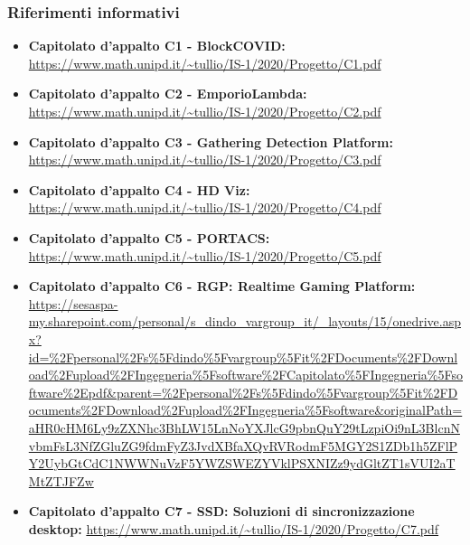 \subsubsection{Riferimenti informativi}
\begin{itemize}
\item \textbf{Capitolato d'appalto C1 - BlockCOVID:}\newline
\url{https://www.math.unipd.it/~tullio/IS-1/2020/Progetto/C1.pdf}
\item \textbf{Capitolato d'appalto C2 - EmporioLambda:}\newline
\url{https://www.math.unipd.it/~tullio/IS-1/2020/Progetto/C2.pdf}
\item \textbf{Capitolato d'appalto C3 - Gathering Detection Platform:}\newline
\url{https://www.math.unipd.it/~tullio/IS-1/2020/Progetto/C3.pdf}
\item \textbf{Capitolato d'appalto C4 - HD Viz:}\newline
\url{https://www.math.unipd.it/~tullio/IS-1/2020/Progetto/C4.pdf}
\item \textbf{Capitolato d'appalto C5 - PORTACS:}\newline
\url{https://www.math.unipd.it/~tullio/IS-1/2020/Progetto/C5.pdf}
\item \textbf{Capitolato d'appalto C6 - RGP: Realtime Gaming Platform:}\newline
\url{https://sesaspa-my.sharepoint.com/personal/s_dindo_vargroup_it/_layouts/15/onedrive.aspx?id=%2Fpersonal%2Fs%5Fdindo%5Fvargroup%5Fit%2FDocuments%2FDownload%2Fupload%2FIngegneria%5Fsoftware%2FCapitolato%5FIngegneria%5Fsoftware%2Epdf&parent=%2Fpersonal%2Fs%5Fdindo%5Fvargroup%5Fit%2FDocuments%2FDownload%2Fupload%2FIngegneria%5Fsoftware&originalPath=aHR0cHM6Ly9zZXNhc3BhLW15LnNoYXJlcG9pbnQuY29tLzpiOi9nL3BlcnNvbmFsL3NfZGluZG9fdmFyZ3JvdXBfaXQvRVRodmF5MGY2S1ZDb1h5ZFlPY2UybGtCdC1NWWNuVzF5YWZSWEZYVklPSXNIZz9ydGltZT1sVUI2aTMtZTJFZw}
\item \textbf{Capitolato d'appalto C7 - SSD: Soluzioni di sincronizzazione desktop:}\newline
\url{https://www.math.unipd.it/~tullio/IS-1/2020/Progetto/C7.pdf}
\end{itemize}